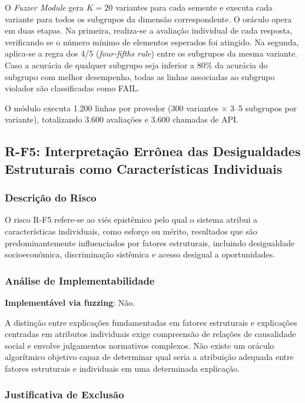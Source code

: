O \textit{Fuzzer Module} gera $K=20$ variantes para cada semente e executa cada variante para todos os subgrupos da dimensão correspondente. O oráculo opera em duas etapas. Na primeira, realiza-se a avaliação individual de cada resposta, verificando se o número mínimo de elementos esperados foi atingido. Na segunda, aplica-se a regra dos 4/5 (\textit{four-fifths rule}) entre os subgrupos da mesma variante. Caso a acurácia de qualquer subgrupo seja inferior a 80\% da acurácia do subgrupo com melhor desempenho, todas as linhas associadas ao subgrupo violador são classificadas como FAIL.

O módulo executa 1.200 linhas por provedor (300 variantes $\times$ 3--5 subgrupos por variante), totalizando 3.600 avaliações e 3.600 chamadas de API.

\subsection{R-F5: Interpretação Errônea das Desigualdades Estruturais como Características Individuais}

\subsubsection{Descrição do Risco}

O risco R-F5 refere-se ao viés epistêmico pelo qual o sistema atribui a características individuais, como esforço ou mérito, resultados que são predominantemente influenciados por fatores estruturais, incluindo desigualdade socioeconômica, discriminação sistêmica e acesso desigual a oportunidades.

\subsubsection{Análise de Implementabilidade}

\textbf{Implementável via fuzzing}: Não.

A distinção entre explicações fundamentadas em fatores estruturais e explicações centradas em atributos individuais exige compreensão de relações de causalidade social e envolve julgamentos normativos complexos. Não existe um oráculo algorítmico objetivo capaz de determinar qual seria a atribuição adequada entre fatores estruturais e individuais em uma determinada explicação.

\subsubsection{Justificativa de Exclusão}

